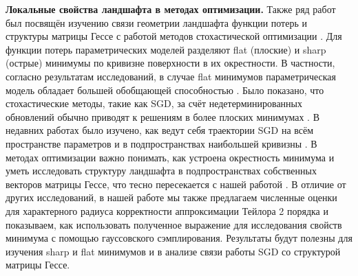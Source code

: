 \documentclass[11pt,a4paper]{article}
\begin{document}
\textbf{Локальные свойства ландшафта в методах оптимизации.}
Также ряд работ был посвящён изучению связи геометрии ландшафта функции потерь и структуры матрицы Гессе с работой методов стохастической оптимизации \cite{Papyan2019FullSpectrum, Dexter2024SGDStability}. 
Для функции потерь параметрических моделей разделяют flat (плоские) и sharp (острые) минимумы по кривизне поверхности в их окрестности\cite{hochreiter1997flat}.
В частности, согласно результатам исследований, в случае flat минимумов параметрическая модель обладает большей обобщающей способностью \cite{dinh2017sharp, foret2021sharpness, keskar2017largebatch}. \newline
Было показано, что стохастические методы, такие как SGD, за счёт недетерминированных обновлений обычно приводят к решениям в более плоских минимумах \cite{WuWangSu2022Alignment}. В недавних работах было изучено, как ведут себя траектории SGD на всём пространстве параметров и в подпространствах наибольшей кривизны \cite{zhou2025bsfa, song2025sgdsubspace}. В методах оптимизации важно понимать, как устроена окрестность минимума и уметь исследовать структуру ландшафта в подпространствах собственных векторов матрицы Гессе, что тесно пересекается с нашей работой \cite{Azadbakht2022KernelSharing, kiselev2024hessian}.
В отличие от других исследований, в нашей работе мы также предлагаем численные оценки для характерного радиуса корректности аппроксимации Тейлора 2 порядка и показываем, как использовать полученное выражение для исследования свойств минимума с помощью гауссовского сэмплирования. Результаты будут полезны для изучения sharp и flat минимумов и в анализе связи работы SGD со структурой матрицы Гессе.
\end{document}
